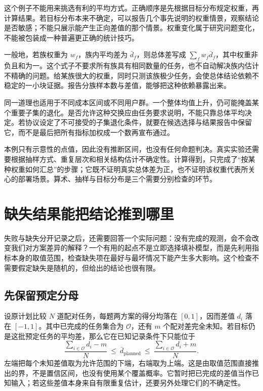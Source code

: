 这个例子不能用来挑选有利的平均方式。正确顺序是先根据目标分布规定权重，再计算结果。若目标分布本来不确定，可以报告几个事先说明的权重情景，观察结论是否敏感；不能只展示能产生正向差值的那个情景。权重变化属于研究问题变化，不能被包装成一种普遍更正确的统计技巧。

一般地，若族权重为 $w_f$，族内平均差为 $\bar d_f$，则总体差写成 $\sum_f w_f\bar d_f$，其中权重非负且和为一。这个式子不要求所有族具有相同数量的任务，也不自动解决族内估计不精确的问题。给某族很大的权重，同时只测该族极少任务，会使总体结论依赖不稳定的一小块证据。报告分族样本数与差值，能够把这种依赖暴露出来。

同一道理也适用于不同成本区间或不同用户群。一个整体均值上升，仍可能掩盖某个重要子集的退化。是否允许这种交换应由任务要求说明，不能只靠总体平均决定。若协议设定了不可接受的子集退化条件，就要在候选选择与结果报告中保留它，而不是最后把所有指标加权成一个数再宣布通过。

本例只有示意性的点值，因此没有推断区间，也没有任何命题判决。真实实验还需要根据抽样方式、重复层次和相关结构估计不确定性。计算得到，只完成了“按某种权重如何汇总”的步骤；它既不证明真实总体差为正，也不证明该权重代表所关心的部署场景。算术、抽样与目标分布是三个需要分别检查的环节。


\section{缺失结果能把结论推到哪里}
\label{sec:ch03-missing-bounds}

失败与缺失分开记录之后，还需要回答一个实际问题：没有完成的观测，会不会改变我们对方案差异的解释？一个有用的起点不是立即选择填补模型，而是先利用指标本身的取值范围，检查缺失项在最好与最坏情况下能产生多大影响。这个检查不需要假定缺失是随机的，但给出的结论也很有限。

\subsection{先保留预定分母}

设原计划比较 $N$ 道配对任务，每题两方案的得分均落在 $[0,1]$，因而差值 $d_i$ 落在 $[-1,1]$。其中已完成的任务集合为 $\mathcal O$，还有 $m$ 个配对差完全未知。若目标仍是这批预定任务的平均差，那么它在已知记录条件下只能位于
\begin{equation}
 \frac{\sum_{i\in\mathcal O}d_i-m}{N}
 \ \leq\ \bar d_{\mathrm{planned}}\ \leq\
 \frac{\sum_{i\in\mathcal O}d_i+m}{N}.
 \label{eq:ch03-missing-bounds}
\end{equation}
左端把每个未知差值取为允许范围的下端，右端取为上端。这是由取值范围直接推出的界，不是置信区间，也没有使用某个覆盖概率。它暂时把已完成的差值当作已知输入；若这些差值本身来自有限重复估计，还要另外处理它们的不确定性。

